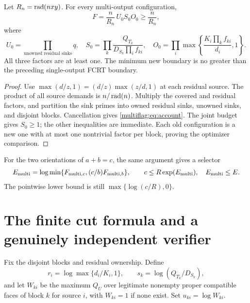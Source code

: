 \begin{theorem}\label{multiflag:thm:account}
Let \(R_n=\operatorname{rad}(nxy)\). For every multi-output configuration,
\begin{equation}\label{multiflag:eq:account}
 F=\frac{n}{R_n}\,U_0S_0O_0\ge\frac{n}{R_n},
\end{equation}
where
\[
 U_0=\prod_{\text{unowned residual sinks}}q,\quad
 S_0=\prod_k\frac{Q_{T_k}}{D_{S_k}\prod_i f_{ki}},\quad
 O_0=\prod_i\max\left\{\frac{K_i\prod_k f_{ki}}{d_i},1\right\}.
\]
All three factors are at least one. The minimum new boundary is no greater than the preceding single-output FCRT boundary.
\end{theorem}
\begin{proof}
Use \(\max(d/z,1)=(d/z)\max(z/d,1)\) at each residual source. The product of all source demands is \(n/\operatorname{rad}(n)\). Multiply the covered and residual factors, and partition the sink primes into owned residual sinks, unowned sinks, and disjoint blocks. Cancellation gives \eqref{multiflag:eq:account}. The joint budget gives \(S_0\ge1\); the other inequalities are immediate. Each old configuration is a new one with at most one nontrivial factor per block, proving the optimizer comparison.
\end{proof}
For the two orientations of \(a+b=c\), the same argument gives a selector
\[
 E_{\rm multi}=\log\min\{F_{{\rm multi},c},(c/b)F_{{\rm multi},b}\},\qquad
 c\le R\exp(E_{\rm multi}),\quad E_{\rm multi}\le E.
\]
The pointwise lower bound is still \(\max\{\log(c/R),0\}\).

\section{The finite cut formula and a genuinely independent verifier}\label{multiflag:sec:cut}
Fix the disjoint blocks and residual ownership. Define
\[
 r_i=\log\max\{d_i/K_i,1\},\qquad s_k=\log(Q_{T_k}/D_{S_k}),
\]
and let \(W_{ki}\) be the maximum \(Q_U\) over legitimate nonempty proper compatible faces of block \(k\) for source \(i\), with \(W_{ki}=1\) if none exist. Set \(u_{ki}=\log W_{ki}\).

